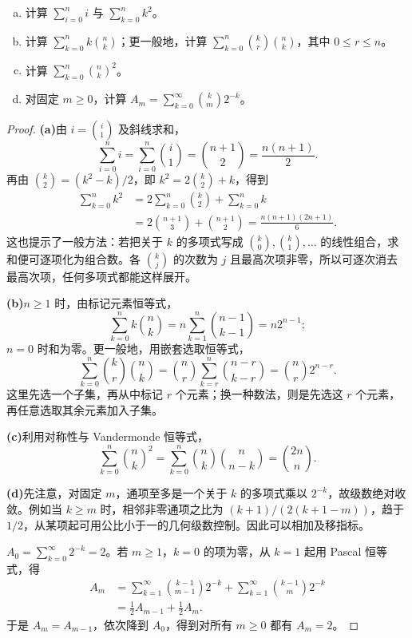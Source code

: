 \documentclass[lang=cn,a4paper,fontset=none,zihao=false,10pt,openany,twoside]{beautybook}
\numberwithin{algorithm}{chapter}
\begin{document}
\begin{example}[用组合数计算求和]
\begin{enumerate}[(a)]
\item 计算 $\sum_{i=0}^n i$ 与 $\sum_{k=0}^n k^2$。
\item 计算 $\sum_{k=0}^n k\binom nk$；更一般地，计算 $\sum_{k=0}^n\binom kr\binom nk$，其中 $0\le r\le n$。
\item 计算 $\sum_{k=0}^n\binom nk^2$。
\item 对固定 $m\ge0$，计算 $A_m=\sum_{k=0}^{\infty}\binom km2^{-k}$。
\end{enumerate}
\end{example}
\begin{proof}
\par\smallskip\noindent\textbf{(a)}\quad 由 $i=\binom i1$ 及斜线求和，
\[
 \sum_{i=0}^n i=\sum_{i=0}^n\binom i1=\binom{n+1}2=\frac{n(n+1)}2.
\]
再由 $\binom k2=(k^2-k)/2$，即 $k^2=2\binom k2+k$，得到
\[
 \begin{aligned}
 \sum_{k=0}^n k^2
 &=2\sum_{k=0}^n\binom k2+\sum_{k=0}^n k\\
 &=2\binom{n+1}3+\binom{n+1}2
 =\frac{n(n+1)(2n+1)}6.
 \end{aligned}
\]
这也提示了一般方法：若把关于 $k$ 的多项式写成 $\binom k0,\binom k1,\ldots$ 的线性组合，求和便可逐项化为组合数。各 $\binom kj$ 的次数为 $j$ 且最高次项非零，所以可逐次消去最高次项，任何多项式都能这样展开。

\par\smallskip\noindent\textbf{(b)}\quad $n\ge1$ 时，由标记元素恒等式，
\[
 \sum_{k=0}^n k\binom nk
 =n\sum_{k=1}^n\binom{n-1}{k-1}=n2^{n-1};
\]
$n=0$ 时和为零。更一般地，用嵌套选取恒等式，
\[
 \sum_{k=0}^n\binom kr\binom nk
 =\binom nr\sum_{k=r}^n\binom{n-r}{k-r}
 =\binom nr2^{n-r}.
\]
这里先选一个子集，再从中标记 $r$ 个元素；换一种数法，则是先选这 $r$ 个元素，再任意选取其余元素加入子集。

\par\smallskip\noindent\textbf{(c)}\quad 利用对称性与 Vandermonde 恒等式，
\[
 \sum_{k=0}^n\binom nk^2
 =\sum_{k=0}^n\binom nk\binom n{n-k}
 =\binom{2n}n.
\]

\par\smallskip\noindent\textbf{(d)}\quad 先注意，对固定 $m$，通项至多是一个关于 $k$ 的多项式乘以 $2^{-k}$，故级数绝对收敛。例如当 $k\ge m$ 时，相邻非零通项之比为 $(k+1)/(2(k+1-m))$，趋于 $1/2$，从某项起可用公比小于一的几何级数控制。因此可以相加及移指标。

$A_0=\sum_{k=0}^{\infty}2^{-k}=2$。若 $m\ge1$，$k=0$ 的项为零，从 $k=1$ 起用 Pascal 恒等式，得
\[
 \begin{aligned}
 A_m
 &=\sum_{k=1}^{\infty}\binom{k-1}{m-1}2^{-k}
   +\sum_{k=1}^{\infty}\binom{k-1}m2^{-k}\\
 &=\frac12 A_{m-1}+\frac12 A_m.
 \end{aligned}
\]
于是 $A_m=A_{m-1}$，依次降到 $A_0$，得到对所有 $m\ge0$ 都有 $A_m=2$。
\end{proof}
\end{document}
